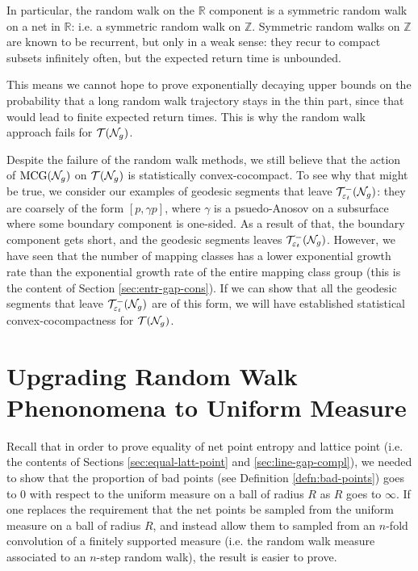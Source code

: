 In particular, the random walk on the $\mathbb{R}$ component is a symmetric random walk on a net in $\mathbb{R}$: i.e. a symmetric random walk on $\mathbb{Z}$.
Symmetric random walks on $\mathbb{Z}$ are known to be recurrent, but only in a weak sense: they recur to compact subsets infinitely often, but the expected return time is unbounded.

This means we cannot hope to prove exponentially decaying upper bounds on the probability that a long random walk trajectory stays in the thin part, since that would lead to finite expected return times.
This is why the random walk approach fails for $\mathcal{T}(\mathcal{N}_g)$.

Despite the failure of the random walk methods, we still believe that the action of $\mathrm{MCG}(\mathcal{N}_g)$ on $\mathcal{T}(\mathcal{N}_g)$ is statistically convex-cocompact.
To see why that might be true, we consider our examples of geodesic segments that leave $\mathcal{T}_{\varepsilon_t}^{-}(\mathcal{N}_g)$: they are coarsely of the form $[p, \gamma p]$, where $\gamma$ is a psuedo-Anosov on a subsurface where some boundary component is one-sided.
As a result of that, the boundary component gets short, and the geodesic segments leaves $\mathcal{T}_{\varepsilon_t}^{-}(\mathcal{N}_g)$.
However, we have seen that the number of mapping classes has a lower exponential growth rate than the exponential growth rate of the entire mapping class group (this is the content of Section \ref{sec:entr-gap-cons}).
If we can show that all the geodesic segments that leave $\mathcal{T}_{\varepsilon_t}^{-}(\mathcal{N}_g)$ are of this form, we will have established statistical convex-cocompactness for $\mathcal{T}(\mathcal{N}_g)$.

\section{Upgrading Random Walk Phenonomena to Uniform Measure}
\label{sec:upgr-rand-walk}

Recall that in order to prove equality of net point entropy and lattice point (i.e. the contents of Sections \ref{sec:equal-latt-point} and \ref{sec:line-gap-compl}), we needed to show that the proportion of bad points (see Definition \ref{defn:bad-points}) goes to $0$ with respect to the uniform measure on a ball of radius $R$ as $R$ goes to $\infty$.
If one replaces the requirement that the net points be sampled from the uniform measure on a ball of radius $R$, and instead allow them to sampled from an $n$-fold convolution of a finitely supported measure (i.e. the random walk measure associated to an $n$-step random walk), the result is easier to prove.

